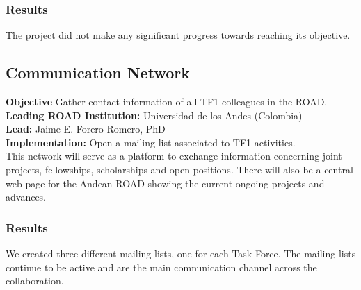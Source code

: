 
\subsubsection{Results}

The project  did not make any significant progress towards reaching its
objective.  



\subsection{Communication Network}
\textbf{Objective} Gather contact information of all TF1 colleagues in the ROAD.
\\
\textbf{Leading ROAD Institution:} Universidad de los Andes (Colombia)
\\
\textbf{Lead:} Jaime E. Forero-Romero, PhD
\\
\textbf{Implementation:} Open a mailing list associated to TF1 activities.
\\
This network will serve as a platform to exchange information
concerning joint projects, fellowships, scholarships and open
positions. There will also be a central web-page for the Andean ROAD
showing the current ongoing projects and advances. 

\subsubsection{Results}
We created three different mailing lists, one for each Task Force. The
mailing lists continue to be active  and are the main comnunication
channel across the collaboration. 


